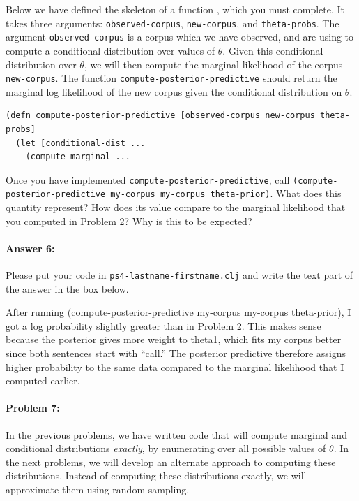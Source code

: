 \documentclass[10pt]{article}
\newenvironment{AnswerBox}{\begin{mdframed}[style=simple]}{\end{mdframed}}
\newcommand{\required}[1]{{\color{blue}{#1}}}
\newcommand{\PSnum}{4}
\begin{document}
 Below we have defined the skeleton of a function
\required{\texttt{compute-posterior-predictive}}, which you must
complete. It takes three arguments: \texttt{observed-corpus},
\texttt{new-corpus}, and \texttt{theta-probs}. The argument
\texttt{observed-corpus} is a corpus which we have observed, and are
using to compute a conditional distribution over values of $\theta$.
Given this conditional distribution over $\theta$, we will then
compute the marginal likelihood of the corpus \texttt{new-corpus}. The
function \texttt{compute-posterior-predictive} should return the
marginal log likelihood of the new corpus given the conditional
distribution on $\theta$.

\begin{lstlisting}
(defn compute-posterior-predictive [observed-corpus new-corpus theta-probs]
  (let [conditional-dist ...
    (compute-marginal ...
\end{lstlisting}

 Once you have implemented
\texttt{compute-posterior-predictive}, call
\texttt{(compute-posterior-predictive my-corpus my-corpus
theta-prior)}. What does this quantity represent? How does its value
compare to the marginal likelihood that you computed in Problem 2? Why
is this to be expected?

\paragraph{Answer 6:} Please put your code in
\texttt{ps\PSnum-lastname-firstname.clj} and write the text part of
the answer in the box below.

\begin{AnswerBox}%

    After running (compute-posterior-predictive my-corpus my-corpus theta-prior), I got a log probability slightly greater than in Problem 2. This makes sense because the posterior gives more weight to theta1, which fits my corpus better since both sentences start with “call.” The posterior predictive therefore assigns higher probability to the same data compared to the marginal likelihood that I computed earlier.
    
\end{AnswerBox}%

\hrulefill %

\paragraph{Problem 7:}
In the previous problems, we have written code that will compute
marginal and conditional distributions \emph{exactly}, by enumerating
over all possible values of $\theta$. In the next problems, we will
develop an alternate approach to computing these distributions.
Instead of computing these distributions exactly, we will approximate
them using random sampling.  \\
\end{document}
